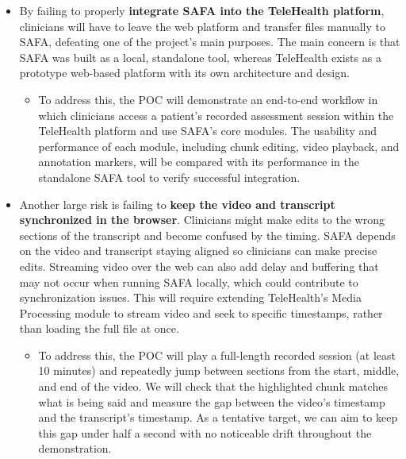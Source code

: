 \documentclass{article}
\begin{document}
\begin{itemize}
  \item By failing to properly \textbf{integrate SAFA into the TeleHealth platform},
  clinicians will have to leave the web platform and transfer files manually
  to SAFA, defeating one of the project's main purposes. The main concern
  is that SAFA was built as a local, standalone tool, whereas TeleHealth
  exists as a prototype web-based platform with its own architecture and design.
    \begin{itemize}
      \item To address this, the POC will demonstrate an end-to-end workflow in which
      clinicians access a patient's recorded assessment session within the TeleHealth
      platform and use SAFA's core modules. The usability and performance of each
      module, including chunk editing, video playback, and annotation markers, will
      be compared with its performance in the standalone SAFA tool to verify successful
      integration.
    \end{itemize}

  \item Another large risk is failing to \textbf{keep the video and transcript synchronized in
  the browser}. Clinicians might make edits to the wrong sections of the transcript
  and become confused by the timing. SAFA depends on the video and transcript staying
  aligned so clinicians can make precise edits. Streaming video over the web can also
  add delay and buffering that may not occur when running SAFA locally, which could contribute
  to synchronization issues. This will require extending TeleHealth's Media Processing
  module to stream video and seek to specific timestamps, rather than loading the full
  file at once.
  \begin{itemize}
    \item To address this, the POC will play a full-length recorded session
    (at least 10 minutes) and repeatedly jump between sections from the start, middle,
    and end of the video. We will check that the highlighted chunk matches what is
    being said and measure the gap between the video's timestamp and the transcript's
    timestamp. As a tentative target, we can aim to keep this gap under half a second
    with no noticeable drift throughout the demonstration.
  \end{itemize}


\end{itemize}
\end{document}

